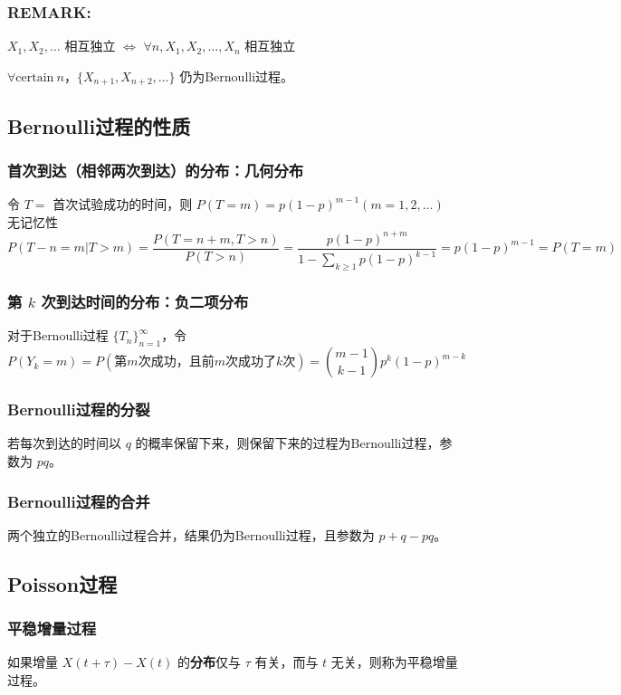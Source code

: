 \documentclass[./main.tex]{subfiles}
\begin{document}
\subsubsection{REMARK:}
\begin{enumerate*}
    \item $X_1,X_2,\dots$ 相互独立 $\iff$ $\forall n,X_1,X_2,\dots,X_n$ 相互独立
    \item $\forall \text{certain}\ n$，$\{X_{n+1},X_{n+2},\dots\}$ 仍为Bernoulli过程。
\end{enumerate*}
\subsection{Bernoulli过程的性质}
\subsubsection{首次到达（相邻两次到达）的分布：几何分布}
令 $T=$ 首次试验成功的时间，则 $P(T=m)=p(1-p)^{m-1}(m=1,2,\dots)$\\
无记忆性
\begin{equation}
    P(T-n=m|T>m)=\frac{P(T=n+m,T>n)}{P(T>n)}=\frac{p(1-p)^{n+m}}{1-\sum_{k\ge 1}p(1-p)^{k-1}}=p(1-p)^{m-1}=P(T=m)
\end{equation}
\subsubsection{第 $k$ 次到达时间的分布：负二项分布}
对于Bernoulli过程 $\{T_n\}_{n=1}^{\infty}$，令$$P(Y_k=m)=P(\text{第$m$次成功，且前$m$次成功了$k$次})=\binom{m-1}{k-1}p^k(1-p)^{m-k}$$
\subsubsection{Bernoulli过程的分裂}
若每次到达的时间以 $q$ 的概率保留下来，则保留下来的过程为Bernoulli过程，参数为 $pq$。
\subsubsection{Bernoulli过程的合并}
两个独立的Bernoulli过程合并，结果仍为Bernoulli过程，且参数为 $p+q-pq$。
\subsection{Poisson过程}
\subsubsection{平稳增量过程}
 如果增量 $X(t+\tau)-X(t)$ 的\textbf{分布}仅与 $\tau$ 有关，而与 $t$ 无关，则称为平稳增量过程。
\end{document}
